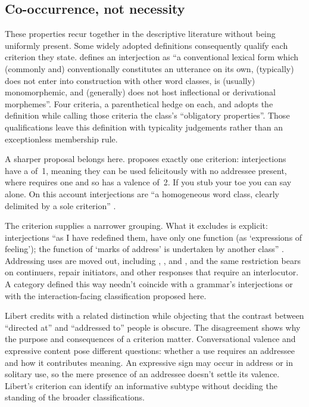 \documentclass[12pt]{article}
\begin{document}
\subsection{Co-occurrence, not necessity}\label{sec:cooccurrence}

These properties recur together in the descriptive literature without being uniformly present. Some widely adopted definitions consequently qualify each criterion they state. \textcite[124]{wilkins1992} defines an interjection as \enquote{a conventional lexical form which (commonly and) conventionally constitutes an utterance on its own, (typically) does not enter into construction with other word classes, is (usually) monomorphemic, and (generally) does not host inflectional or derivational morphemes}. Four criteria, a parenthetical hedge on each, and \textcite[73]{gehweiler2008} adopts the definition while calling those criteria the class's \enquote{obligatory properties}. Those qualifications leave this definition with typicality judgements rather than an exceptionless membership rule.

A sharper proposal belongs here. \textcite[287, 292]{libert2012} proposes exactly one criterion: interjections have a  of~1, meaning they can be used felicitously with no addressee present, where  requires one and so has a valence of~2. If you stub your toe you can say  alone. On this account interjections are \enquote{a homogeneous word class, clearly delimited by a sole criterion} \citep[294]{libert2012}.

The criterion supplies a narrower grouping. What it excludes is explicit: interjections \enquote{as I have redefined them, have only one function (as `expressions of feeling'); the function of `marks of address' is undertaken by another class} \citep[294]{libert2012}. Addressing uses are moved out, including , , and , and the same restriction bears on continuers, repair initiators, and other responses that require an interlocutor. A category defined this way needn't coincide with a grammar's interjections or with the interaction-facing classification proposed here.

Libert credits \textcite[109]{ameka1992} with a related distinction while objecting that the contrast between \enquote{directed at} and \enquote{addressed to} people is obscure. The disagreement shows why the purpose and consequences of a criterion matter. Conversational valence and expressive content pose different questions: whether a use requires an addressee and how it contributes meaning. An expressive sign may occur in address or in solitary use, so the mere presence of an addressee doesn't settle its valence. Libert's criterion can identify an informative subtype without deciding the standing of the broader classifications.
\end{document}
